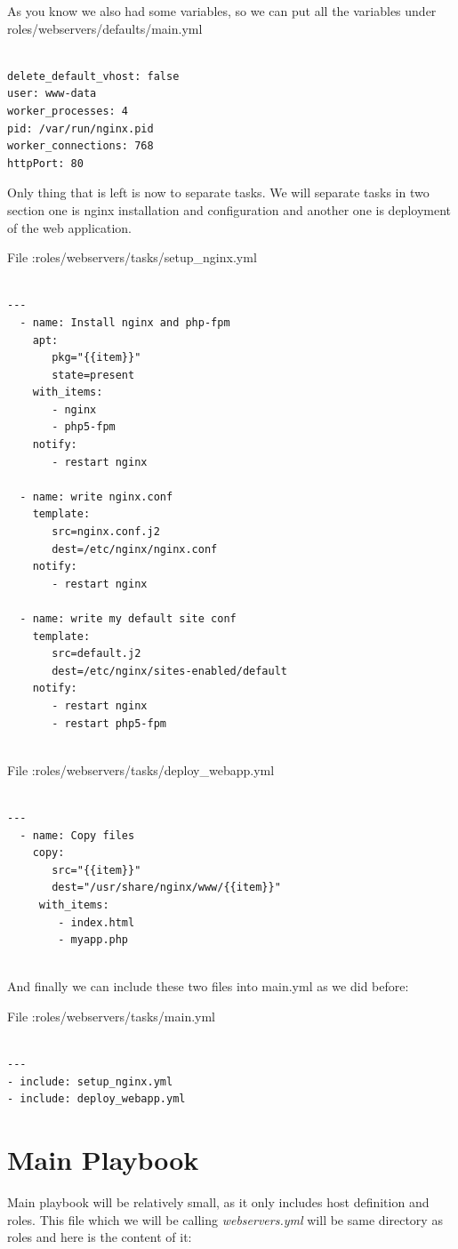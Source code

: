 \documentclass[10pt]{book}
\begin{document}
As you know we also had some variables, so we can put all the variables under roles/webservers/defaults/main.yml

\begin{Verbatim} 
 
delete_default_vhost: false
user: www-data
worker_processes: 4 
pid: /var/run/nginx.pid
worker_connections: 768
httpPort: 80

\end{Verbatim}  


Only thing that is left is now to separate tasks. We will separate tasks in two 
section one is nginx installation and configuration and another one is 
deployment of the web application.

File :roles/webservers/tasks/setup\_nginx.yml
\begin{Verbatim} 
 
---
  - name: Install nginx and php-fpm 
    apt: 
       pkg="{{item}}"
       state=present
    with_items:
       - nginx
       - php5-fpm
    notify:
       - restart nginx

  - name: write nginx.conf
    template: 
       src=nginx.conf.j2
       dest=/etc/nginx/nginx.conf
    notify:
       - restart nginx

  - name: write my default site conf
    template: 
       src=default.j2
       dest=/etc/nginx/sites-enabled/default
    notify: 
       - restart nginx
       - restart php5-fpm
      
\end{Verbatim}  


File :roles/webservers/tasks/deploy\_webapp.yml
\begin{Verbatim} 
 
---
  - name: Copy files
    copy: 
       src="{{item}}"
       dest="/usr/share/nginx/www/{{item}}"
     with_items:
        - index.html 
        - myapp.php
      
\end{Verbatim} 


And finally we can include these two files into main.yml as we did before:

File :roles/webservers/tasks/main.yml
\begin{Verbatim} 
 
---
- include: setup_nginx.yml
- include: deploy_webapp.yml

\end{Verbatim}  


\section{Main Playbook}
Main playbook will be relatively small, as it only includes host definition and 
roles. This file which we will be calling \emph{webservers.yml} will be same 
directory as roles and here is the content of it:
\end{document}
